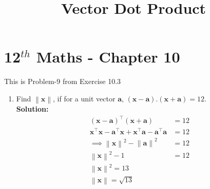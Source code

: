 \documentclass[12pt]{article}
\providecommand{\brak}[1]{\ensuremath{\left(#1\right)}}
\providecommand{\norm}[1]{\left\lVert#1\right\rVert}
\newcommand{\solution}{\noindent \textbf{Solution: }}
\let\vec\mathbf
\begin{document}
\begin{center}
\title{\textbf{Vector Dot Product}}
\date{\vspace{-5ex}} %
\maketitle
\end{center}
\setcounter{page}{1}

\section{12$^{th}$ Maths - Chapter 10}
This is Problem-9 from Exercise 10.3
\begin{enumerate}
\item Find $\norm{\vec{x}}$, if for a unit vector $\vec{a}$, $\brak{\vec{x}-\vec{a}}.\brak{\vec{x}+\vec{a}} = 12$.\\
\solution 
\begin{align*}
  \label{eq:det2f}
  \brak{\vec{x}-\vec{a}}^\top\brak{\vec{x}+\vec{a}} &= 12 \\
  \vec{x}^\top\vec{x} - \vec{a}^\top\vec{x} + \vec{x}^\top\vec{a} - \vec{a}^\top\vec{a} &= 12 \\
  \implies \norm{\vec{x}}^{2} - \norm{\vec{a}}^{2} &= 12 \\
  \norm{\vec{x}}^{2} - 1 &= 12  \\
  \norm{\vec{x}}^{2} = 13 \\
  \norm{\vec{x}} = \sqrt{13}
\end{align*}
\end{enumerate}
\end{document}
